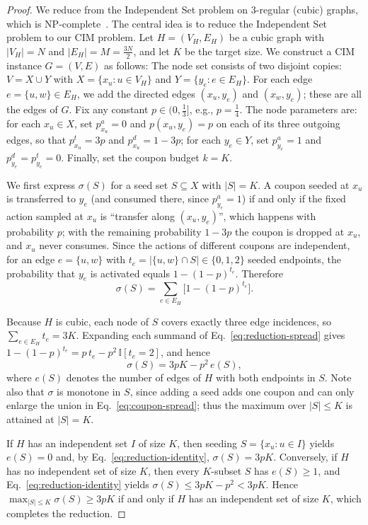 \documentclass[sigconf]{acmart}
\begin{document}
\begin{proof}\renewcommand{\qedsymbol}{}
We reduce from the Independent Set problem on $3$-regular (cubic)
graphs, which is NP-complete~\cite{garey1979computers,garey1976some}. The central idea is to reduce the Independent Set problem to our CIM problem.
Let $H=(V_H,E_H)$ be a cubic graph with $|V_H|=N$ and
$|E_H|=M=\tfrac{3N}{2}$, and let $K$ be the target size.
We construct a CIM instance $G=(V,E)$ as follows:
The node set consists of two disjoint copies:
$V=X\cup Y$ with $X=\{x_u: u\in V_H\}$ and
$Y=\{y_e: e\in E_H\}$.
For each edge $e=\{u,w\}\in E_H$, we add the directed edges
$(x_u,y_e)$ and $(x_w,y_e)$; these are all the edges of $G$.
Fix any constant $p\in(0,\tfrac13]$, e.g., $p=\tfrac14$.
The node parameters are:
for each $x_u\in X$, set $p_{x_u}^a=0$ and $p(x_u,y_e)=p$ on each of
its three outgoing edges, so that $p_{x_u}^t=3p$ and
$p_{x_u}^d=1-3p$;
for each $y_e\in Y$, set $p_{y_e}^a=1$ and $p_{y_e}^d=p_{y_e}^t=0$.
Finally, set the coupon budget $k=K$.

We first express $\sigma(S)$ for a seed set $S\subseteq X$ with
$|S|=K$.
A coupon seeded at $x_u$ is transferred to $y_e$ (and consumed there,
since $p_{y_e}^a=1$) if and only if the fixed action sampled at $x_u$
is ``transfer along $(x_u,y_e)$'', which happens with probability
$p$; with the remaining probability $1-3p$ the coupon is dropped at
$x_u$, and $x_u$ never consumes.
Since the actions of different coupons are independent, for an edge
$e=\{u,w\}$ with $t_e=|\{u,w\}\cap S|\in\{0,1,2\}$ seeded endpoints,
the probability that $y_e$ is activated equals
$1-(1-p)^{t_e}$.
Therefore
\begin{equation}
\label{eq:reduction-spread}
\sigma(S)
=\sum_{e\in E_H}\bigl[1-(1-p)^{t_e}\bigr].
\end{equation}

Because $H$ is cubic, each node of $S$ covers exactly three edge
incidences, so $\sum_{e\in E_H} t_e = 3K$.
Expanding each summand of Eq.~\eqref{eq:reduction-spread} gives
$1-(1-p)^{t_e}=p\,t_e-p^2\,\mathbb{I}[t_e=2]$, and hence
\begin{equation}
\label{eq:reduction-identity}
\sigma(S)=3pK-p^2\,e(S),
\end{equation}
where $e(S)$ denotes the number of edges of $H$ with both endpoints
in $S$.
Note also that $\sigma$ is monotone in $S$, since adding a seed adds
one coupon and can only enlarge the union in
Eq.~\eqref{eq:coupon-spread}; thus the maximum over $|S|\le K$ is
attained at $|S|=K$.

If $H$ has an independent set $I$ of size $K$, then seeding
$S=\{x_u:u\in I\}$ yields $e(S)=0$ and, by
Eq.~\eqref{eq:reduction-identity}, $\sigma(S)=3pK$.
Conversely, if $H$ has no independent set of size $K$, then every
$K$-subset $S$ has $e(S)\ge 1$, and
Eq.~\eqref{eq:reduction-identity} yields
$\sigma(S)\le 3pK-p^2<3pK$.
Hence $\max_{|S|\le K}\sigma(S)\ge 3pK$ if and only if $H$ has an
independent set of size $K$, which completes the reduction.
\end{proof}
\end{document}
